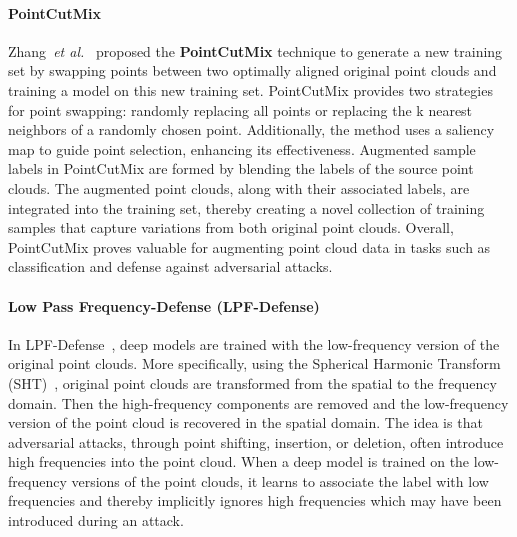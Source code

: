 \documentclass{ieeeaccess}
\def\etal{\textit{et al.}}
\begin{document}
\paragraph{PointCutMix}
\label{sec:PointCutMix}
Zhang~\etal~\cite{zhang2022pointcutmix} proposed the \textbf{PointCutMix} technique to generate a new training set by swapping points between two optimally aligned original point clouds and training a model on this new training set. 
PointCutMix provides two strategies for point swapping: randomly replacing all points or replacing the k nearest neighbors of a randomly chosen point. Additionally, the method uses a saliency map to guide point selection, enhancing its effectiveness. Augmented sample labels in PointCutMix are formed by blending the labels of the source point clouds. The augmented point clouds, along with their associated labels, are integrated into the training set, thereby creating a novel collection of training samples that capture variations from both original point clouds. Overall, PointCutMix proves valuable for augmenting point cloud data in tasks such as classification and defense against adversarial attacks.

\paragraph{Low Pass Frequency-Defense (LPF-Defense)}
\label{sec:LPF-Defense}
In LPF-Defense~\cite{naderi2023lpf}, deep models are trained with the low-frequency version of the original point clouds.  More specifically, using the Spherical Harmonic Transform (SHT)~\cite{cohen2018spherical}, original point clouds are transformed from the spatial to the frequency domain. Then the high-frequency components are removed and the low-frequency version of the point cloud is %
recovered in the spatial domain. %
The idea is that adversarial attacks, through point shifting, insertion, or deletion, often introduce high frequencies into the point cloud. When a deep model is trained on the low-frequency versions of the point clouds, it learns to associate the label with low frequencies and thereby implicitly ignores high frequencies which may have been introduced during an attack.
\end{document}
